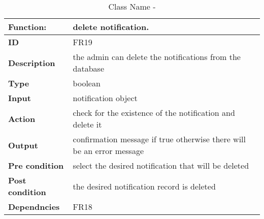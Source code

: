 \documentclass[]{article}
\begin{document}
\FloatBarrier
\begin{table}[h]
\caption{Class Name - }
\label{tab:my-table}
\begin{tabular}{|p{}|p{}|}
\hline
\textbf{Function:} & delete notification.
\\ \hline
\textbf{ID}  & FR19

\\ \hline
\textbf{Description}    & the admin can delete the notifications from the database                                                                     
\\ \hline
\textbf{Type}    &  boolean       

\\ \hline
\textbf{Input}        & notification object


\\ \hline
\textbf{Action}            & check for the existence of the notification and delete it 

\\ \hline
\textbf{Output}            & confirmation message if true otherwise there will be an error message 

\\ \hline
\textbf{Pre condition}           & select the desired notification that will be deleted  

\\ \hline
\textbf{Post condition}           & the desired notification record is deleted


\\ \hline
\textbf{Dependncies}           & FR18
\\ \hline
\end{tabular}
\end{table}
\end{document}

